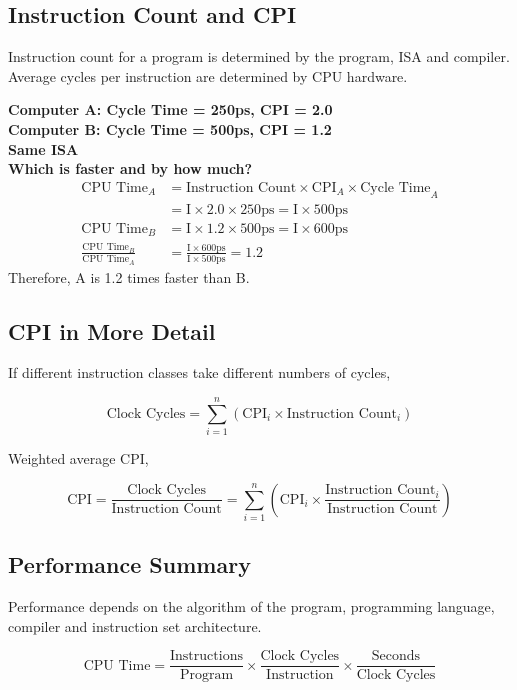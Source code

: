 \subsection{Instruction Count and CPI}

Instruction count for a program is determined by the program, ISA and compiler. Average cycles per instruction are determined by CPU hardware.

\begin{framed}
\textbf{Computer A: Cycle Time = 250ps, CPI = 2.0\\Computer B: Cycle Time = 500ps, CPI = 1.2\\Same ISA\\Which is faster and by how much?}
\begin{align*}
    \mbox{CPU Time}_A &= \mbox{Instruction Count} \times \mbox{CPI}_A \times \mbox{Cycle Time}_A \\
    &= \mbox{I}\times 2.0 \times 250\mbox{ps} = \mbox{I}\times 500\mbox{ps} \\
    \mbox{CPU Time}_B &= \mbox{I}\times 1.2 \times 500\mbox{ps} = \mbox{I}\times 600\mbox{ps} \\
    \frac{\mbox{CPU Time}_B}{\mbox{CPU Time}_A} &= \frac{\mbox{I}\times 600\mbox{ps}}{\mbox{I}\times 500\mbox{ps}} = \boxed{1.2}
\end{align*}
Therefore, A is 1.2 times faster than B.
\end{framed}

\subsection{CPI in More Detail}
If different instruction classes take different numbers of cycles,

$$ \mbox{Clock Cycles} = \sum^n_{i=1}(\mbox{CPI}_i \times \mbox{Instruction Count}_i) $$

Weighted average CPI,

$$ \mbox{CPI} = \frac{\mbox{Clock Cycles}}{\mbox{Instruction Count}} = \sum^n_{i=1}\left(\mbox{CPI}_i \times \frac{\mbox{Instruction Count}_i}{\mbox{Instruction Count}}\right) $$

\subsection{Performance Summary}

Performance depends on the algorithm of the program, programming language, compiler and instruction set architecture.

$$ \mbox{CPU Time} = \frac{\mbox{Instructions}}{\mbox{Program}} \times \frac{\mbox{Clock Cycles}}{\mbox{Instruction}} \times \frac{\mbox{Seconds}}{\mbox{Clock Cycles}} $$










